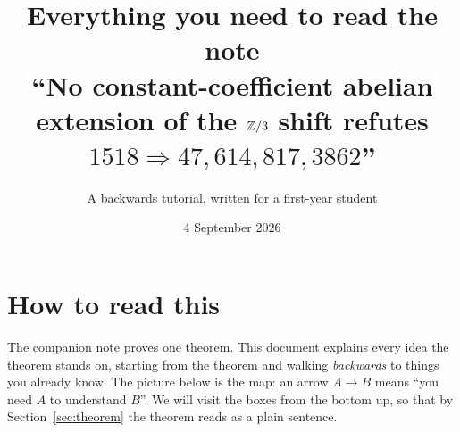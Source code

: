 \documentclass[11pt]{article}
\title{Everything you need to read the note\\``No constant-coefficient abelian extension of the $\mathbb{Z}/3$ shift refutes $1518\Rightarrow 47,614,817,3862$''}
\author{A backwards tutorial, written for a first-year student}
\date{4 September 2026}
\theoremstyle{definition}\newtheorem{example}{Example}\newtheorem{exercise}{Exercise}
\theoremstyle{remark}\newtheorem*{remark}{Remark}
\begin{document}
\maketitle

\section*{How to read this}

The companion note proves one theorem. This document explains every idea the theorem stands on, starting from the theorem and walking \emph{backwards} to things you already know. The picture below is the map: an arrow $A \to B$ means ``you need $A$ to understand $B$''. We will visit the boxes from the bottom up, so that by Section~\ref{sec:theorem} the theorem reads as a plain sentence.
\end{document}
